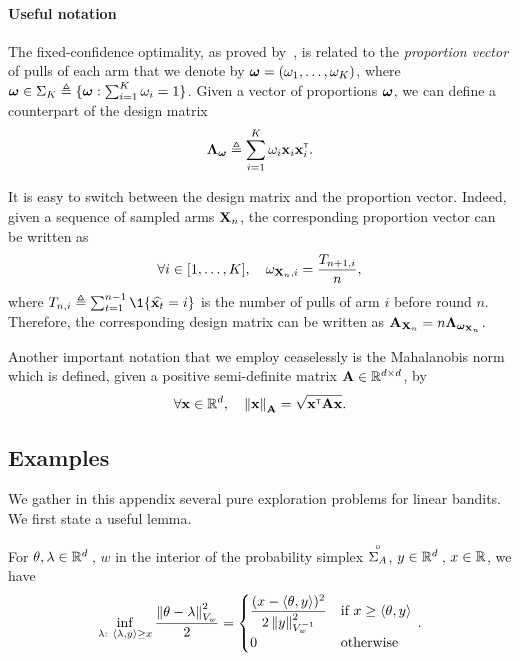\paragraph{Useful notation}
The fixed-confidence optimality, as proved by~\cite{garivier2016tracknstop,russo2016ttts}, is related to the \emph{proportion vector} of pulls of each arm that we denote by ${\boldsymbol \omega} = (\omega_1,\ldots,\omega_K)$, where ${\boldsymbol \omega}\in\Sigma_K \triangleq \{{\boldsymbol \omega} : \sum_{i=1}^K \omega_i = 1\}$. Given a vector of proportions ${\boldsymbol \omega}$, we can define a counterpart of the design matrix 
\[
    {\boldsymbol \Lambda}_{{\boldsymbol \omega}} \triangleq \sum_{i=1}^K \omega_i{\bf x}_i{\bf x}_i^\mathsf{\scriptscriptstyle T}.
\]

It is easy to switch between the design matrix and the proportion vector. Indeed, given a sequence of sampled arms ${\bf X}_n$, the corresponding proportion vector can be written as
\[
    \forall i\in [1,\ldots,K], \quad \omega_{{\bf X}_n,i} = \frac{T_{n+1,i}}{n},
\]
where $T_{n,i} \eqdef \sum_{t=1}^{n-1} \1\{\hat{\bx_t} = i\}$ is the number of pulls of arm $i$ before round $n$. Therefore, the corresponding design matrix can be written as ${\bf A}_{{\bf X}_n}=n{\boldsymbol \Lambda}_{{\boldsymbol \omega}_{{\bf X}_n}}$.

Another important notation that we employ ceaselessly is the Mahalanobis norm which is defined, given a positive semi-definite matrix ${\bf A}\in\mathbb{R}^{d\times d}$, by
\[
    \forall {\bf x}\in\mathbb{R}^d, \quad \left\lVert{\bf x}\right\rVert_{{\bf A}} = \sqrt{{\bf x}^\mathsf{\scriptscriptstyle T}{\bf A}{\bf x}}.
\]

\subsection{Examples}\label{sec:lgc.examples}

We gather in this appendix several pure exploration problems for linear bandits. We first state a useful lemma.

\begin{lemma}\label{lem:lagrange_alternative}
For $\theta, \lambda \in \mathbb{R}^d\,$, $w$ in the interior of the probability simplex $\overset{\circ}{\Sigma_A}$, $y\in\mathbb{R}^d\,$, $x\in\mathbb{R}$, we have
\begin{align*}
\inf_{\lambda:\ \langle \lambda,y\rangle \geq x} \frac{\left\lVert\theta-\lambda\right\rVert^2_{V_w}}{2} = \begin{cases}
\dfrac{(x - \langle\theta,y\rangle)^2}{2 \left\lVert y\right\rVert_{V_w^{-1}}^2} &\text{if } x \geq \langle\theta,y\rangle \\
0 &\text{otherwise}
\end{cases}\,.
\end{align*}
\end{lemma}

